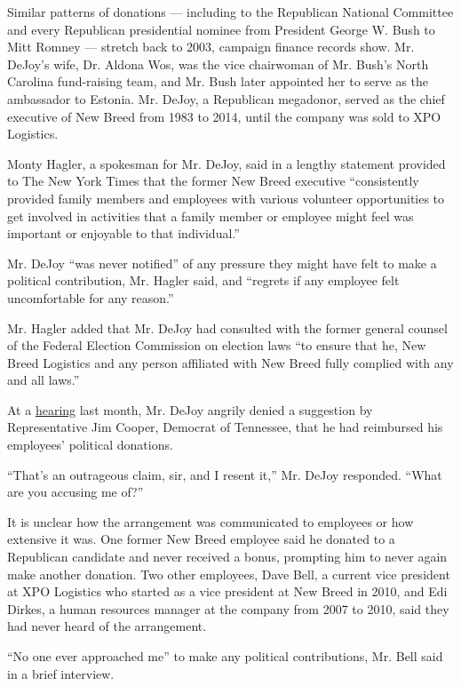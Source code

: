 Similar patterns of donations --- including to the Republican National
Committee and every Republican presidential nominee from President
George W. Bush to Mitt Romney --- stretch back to 2003, campaign finance
records show. Mr. DeJoy's wife, Dr. Aldona Wos, was the vice chairwoman
of Mr. Bush's North Carolina fund-raising team, and Mr. Bush later
appointed her to serve as the ambassador to Estonia. Mr. DeJoy, a
Republican megadonor, served as the chief executive of New Breed from
1983 to 2014, until the company was sold to XPO Logistics.

Monty Hagler, a spokesman for Mr. DeJoy, said in a lengthy statement
provided to The New York Times that the former New Breed executive
``consistently provided family members and employees with various
volunteer opportunities to get involved in activities that a family
member or employee might feel was important or enjoyable to that
individual.''

Mr. DeJoy ``was never notified'' of any pressure they might have felt to
make a political contribution, Mr. Hagler said, and ``regrets if any
employee felt uncomfortable for any reason.''

Mr. Hagler added that Mr. DeJoy had consulted with the former general
counsel of the Federal Election Commission on election laws ``to ensure
that he, New Breed Logistics and any person affiliated with New Breed
fully complied with any and all laws.''

At a
\href{https://www.nytimes3xbfgragh.onion/2020/08/24/us/politics/postal-service-dejoy-testimony.html}{hearing}
last month, Mr. DeJoy angrily denied a suggestion by Representative Jim
Cooper, Democrat of Tennessee, that he had reimbursed his employees'
political donations.

``That's an outrageous claim, sir, and I resent it,'' Mr. DeJoy
responded. ``What are you accusing me of?''

It is unclear how the arrangement was communicated to employees or how
extensive it was. One former New Breed employee said he donated to a
Republican candidate and never received a bonus, prompting him to never
again make another donation. Two other employees, Dave Bell, a current
vice president at XPO Logistics who started as a vice president at New
Breed in 2010, and Edi Dirkes, a human resources manager at the company
from 2007 to 2010, said they had never heard of the arrangement.

``No one ever approached me'' to make any political contributions, Mr.
Bell said in a brief interview.


